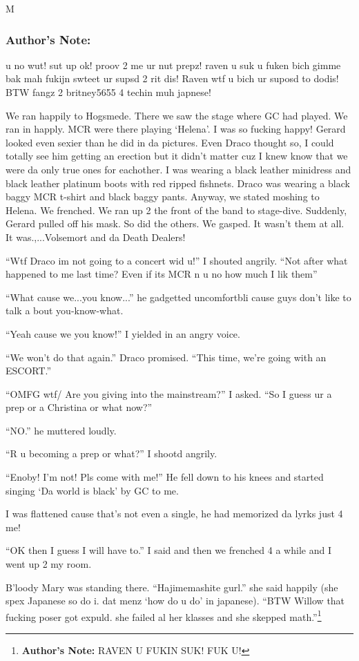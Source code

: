 M\documentclass{article}
\begin{document}
\subsubsection*{Author's Note: }u no wut! sut up ok! proov 2 me ur nut prepz! raven u suk u fuken bich gimme bak mah fukijn swteet ur supsd 2 rit dis! Raven wtf u bich ur suposd to dodis! BTW fangz 2 britney5655 4 techin muh japnese!

\textbreak
\linenumbers\resetlinenumber

We ran happily to Hogsmede. There we saw the stage where GC had played. We ran in happly. MCR were there playing ‘Helena’. I was so fucking happy! Gerard looked even sexier than he did in da pictures. Even Draco thought so, I could totally see him getting an erection but it didn’t matter cuz I knew know that we were da only true ones for eachother. I was wearing a black leather minidress and black leather platinum boots with red ripped fishnets. Draco was wearing a black baggy MCR t-shirt and black baggy pants. Anyway, we stated moshing to Helena. We frenched. We ran up 2 the front of the band to stage-dive. Suddenly, Gerard pulled off his mask. So did the others. We gasped. It wasn’t them at all. It was.,...Volsemort and da Death Dealers!

“Wtf Draco im not going to a concert wid u!” I shouted angrily. “Not after what happened to me last time? Even if its MCR n u no how much I lik them”

“What cause we...you know...” he gadgetted uncomfortbli cause guys don’t like to talk a bout you-know-what.

“Yeah cause we you know!” I yielded in an angry voice.

“We won’t do that again.” Draco promised. “This time, we’re going with an ESCORT.”

“OMFG wtf/ Are you giving into the mainstream?” I asked. “So I guess ur a prep or a Christina or what now?”

“NO.” he muttered loudly.

“R u becoming a prep or what?” I shootd angrily.

“Enoby! I’m not! Pls come with me!” He fell down to his knees and started singing ‘Da world is black’ by GC to me.

I was flattened cause that’s not even a single, he had memorized da lyrks just 4 me!

“OK then I guess I will have to.” I said and then we frenched 4 a while and I went up 2 my room.

B’loody Mary was standing there. “Hajimemashite gurl.” she said happily (she spex Japanese so do i. dat menz ‘how do u do’ in japanese). “BTW Willow that fucking poser got expuld. she failed al her klasses and she skepped math.”\footnote{\textbf{Author's Note:} RAVEN U FUKIN SUK! FUK U!}
\end{document}
